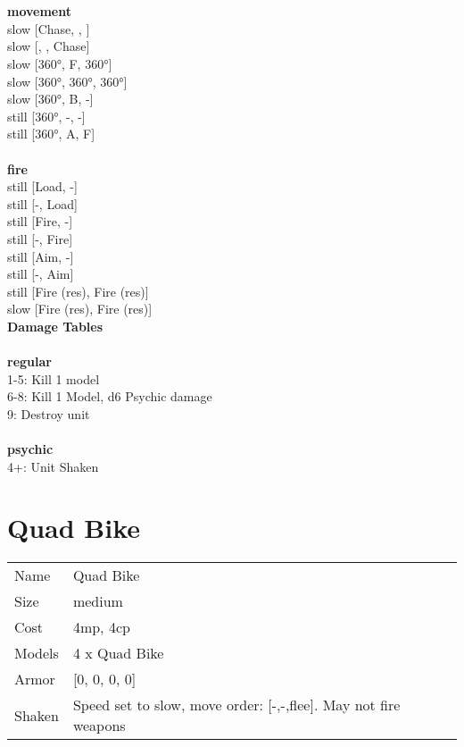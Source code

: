  
\ \\



\ \\ {\bf movement } \\
slow [Chase, , ] \\
slow [, , Chase] \\
slow [360°, F, 360°] \\
slow [360°, 360°, 360°] \\
slow [360°, B, -] \\
still [360°, -, -] \\
still [360°, A, F] \\
\ \\ {\bf fire } \\
still [Load, -] \\
still [-, Load] \\
still [Fire, -] \\
still [-, Fire] \\
still [Aim, -] \\
still [-, Aim] \\
still [Fire (res), Fire (res)] \\
slow [Fire (res), Fire (res)] \\


{\bf Damage Tables} \\
\ \\ {\bf regular } \\
1-5: Kill 1 model \\
6-8: Kill 1 Model, d6 Psychic damage \\
9: Destroy unit \\
\ \\ {\bf psychic } \\
4+: Unit Shaken \\










\pagebreak\pagebreak

\section{ Quad Bike }

\begin{tabular}{ll}
  Name & Quad Bike \\
  Size & medium\\
  Cost & 4mp, 4cp\\
  Models & 4 x Quad Bike\\
  Armor & [0, 0, 0, 0]\\
  Shaken & Speed set to slow, move order: [-,-,flee]. May not fire weapons\\
\end{tabular}

